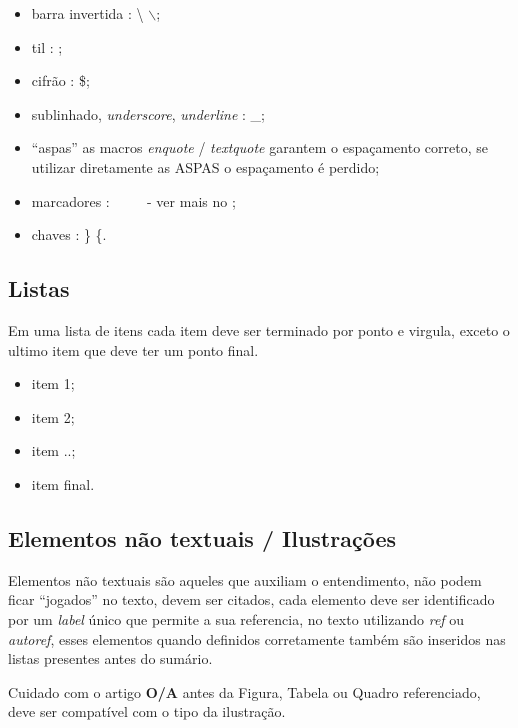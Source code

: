 \begin{itemize}
\item barra invertida : \textbackslash   {}    $\backslash$;
\item til  :   ;
\item cifrão : \$;
\item sublinhado, \emph{underscore}, \emph{underline} : \_;
\item \enquote{aspas} as macros \emph{enquote} / \emph{textquote} garantem o espaçamento correto, se utilizar diretamente as ASPAS o espaçamento é perdido;
\item marcadores : \cmark\ \xmark\ \circlemark\  \ - ver mais no ;
\item chaves : \} \{.
\end{itemize}

\subsection{Listas}

Em uma lista de itens cada item deve ser terminado por ponto e virgula, exceto o ultimo item que deve ter um ponto final.

\begin{itemize}
\item item 1;
\item item 2;
\item item ..;
\item item final.
\end{itemize}






\subsection{Elementos não textuais / Ilustrações}
\label{elementos-nao-textuais}

Elementos não textuais são aqueles que auxiliam o entendimento, não podem ficar \enquote{jogados} no texto, devem ser citados, cada elemento deve ser identificado por um \emph{label} único que permite a sua referencia, no texto utilizando \emph{ref} ou \emph{autoref}, esses elementos quando definidos corretamente também são inseridos nas listas presentes antes do sumário.

Cuidado com o artigo \textbf{O/A} antes da Figura, Tabela ou Quadro referenciado, deve ser compatível com o tipo da ilustração.

